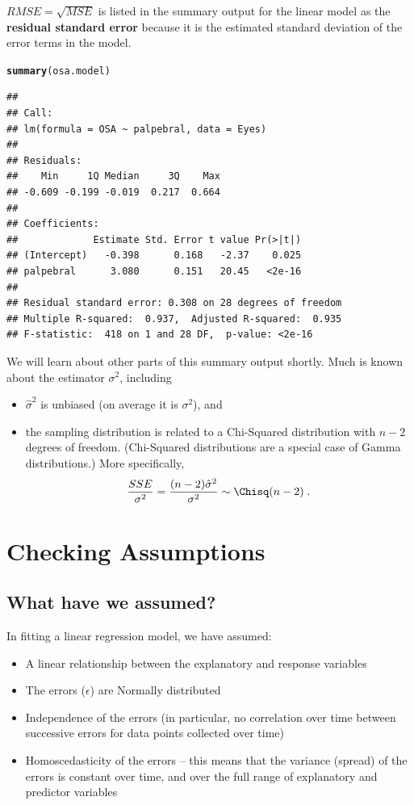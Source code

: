 \documentclass[twoside]{book}\usepackage[]{graphicx}\usepackage[]{xcolor}
\makeatletter
\newcommand{\hlstd}[1]{\textcolor[rgb]{0.345,0.345,0.345}{#1}}%
\newcommand{\hlkwd}[1]{\textcolor[rgb]{0.737,0.353,0.396}{\textbf{#1}}}%
\newenvironment{kframe}{%
 \def\at@end@of@kframe{}%
 \ifinner\ifhmode%
  \def\at@end@of@kframe{\end{minipage}}%
  \begin{minipage}{\columnwidth}%
 \fi\fi%
 \def\FrameCommand##1{\hskip\@totalleftmargin \hskip-\fboxsep
 \colorbox{shadecolor}{##1}\hskip-\fboxsep
     \hskip-\linewidth \hskip-\@totalleftmargin \hskip\columnwidth}%
 \MakeFramed {\advance\hsize-\width
   \@totalleftmargin\z@ \linewidth\hsize
   \@setminipage}}%
 {\par\unskip\endMakeFramed%
 \at@end@of@kframe}
\newenvironment{knitrout}{}{} %
\def\term#1{\textbf{#1}}
\makeatother
\begin{document}
$RMSE = \sqrt{MSE}$ is listed in the summary output for the linear model as the
\term{residual standard error} because it is the estimated standard deviation of 
the error terms in the model.
\begin{knitrout}
\color{fgcolor}\begin{kframe}
\begin{alltt}
\hlkwd{summary}\hlstd{(osa.model)}
\end{alltt}
\begin{verbatim}
## 
## Call:
## lm(formula = OSA ~ palpebral, data = Eyes)
## 
## Residuals:
##    Min     1Q Median     3Q    Max 
## -0.609 -0.199 -0.019  0.217  0.664 
## 
## Coefficients:
##             Estimate Std. Error t value Pr(>|t|)
## (Intercept)   -0.398      0.168   -2.37    0.025
## palpebral      3.080      0.151   20.45   <2e-16
## 
## Residual standard error: 0.308 on 28 degrees of freedom
## Multiple R-squared:  0.937,	Adjusted R-squared:  0.935 
## F-statistic:  418 on 1 and 28 DF,  p-value: <2e-16
\end{verbatim}
\end{kframe}
\end{knitrout}
We will learn about other parts of this summary output shortly.
Much is known about the estimator $\sigma^2$, including 
\begin{itemize}
	\item $\hat \sigma^2$ is unbiased (on average it is $\sigma^2$), and 
	\item
		the sampling distribution is related to a Chi-Squared distribution with
		$n-2$ degrees of freedom.  
		(Chi-Squared distributions are a special case of Gamma distributions.)
		More specifically,
		\[
		\frac{SSE}{\sigma^2} = \frac{(n - 2) \hat \sigma^2}{\sigma^2} \sim \Chisq(n-2) \;.
		\]
\end{itemize}


\section{Checking Assumptions}
\subsection{What have we assumed?}
In fitting a linear regression model, we have assumed:
\begin{itemize}
\item A linear relationship between the explanatory and response variables
\item The errors ($\epsilon$) are Normally distributed
\item Independence of the errors (in particular, no correlation over time between successive errors for data points collected over time)
\item Homoscedasticity of the errors -- this means that the variance (spread) of the errors is constant over time, and over the full range of explanatory and predictor variables
\end{itemize}
\end{document}
